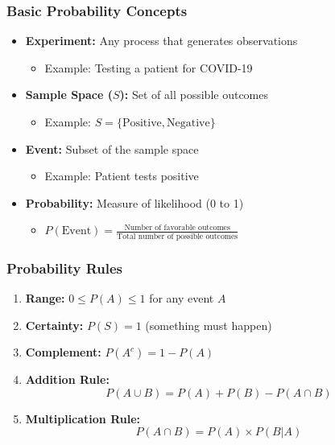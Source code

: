 \documentclass{beamer}
\begin{document}
\begin{frame}
\frametitle{Basic Probability Concepts}
\begin{itemize}
\item \textbf{Experiment:} Any process that generates observations
  \begin{itemize}
  \item Example: Testing a patient for COVID-19
  \end{itemize}
\item \textbf{Sample Space ($S$):} Set of all possible outcomes
  \begin{itemize}
  \item Example: $S = \{\text{Positive}, \text{Negative}\}$
  \end{itemize}
\item \textbf{Event:} Subset of the sample space
  \begin{itemize}
  \item Example: Patient tests positive
  \end{itemize}
\item \textbf{Probability:} Measure of likelihood (0 to 1)
  \begin{itemize}
  \item $P(\text{Event}) = \frac{\text{Number of favorable outcomes}}{\text{Total number of possible outcomes}}$
  \end{itemize}
\end{itemize}
\end{frame}

\begin{frame}
\frametitle{Probability Rules}
\begin{enumerate}
\item \textbf{Range:} $0 \leq P(A) \leq 1$ for any event $A$
\item \textbf{Certainty:} $P(S) = 1$ (something must happen)
\item \textbf{Complement:} $P(A^c) = 1 - P(A)$
\item \textbf{Addition Rule:}
  $$P(A \cup B) = P(A) + P(B) - P(A \cap B)$$
\item \textbf{Multiplication Rule:}
  $$P(A \cap B) = P(A) \times P(B|A)$$
\end{enumerate}
\end{frame}
\end{document}
